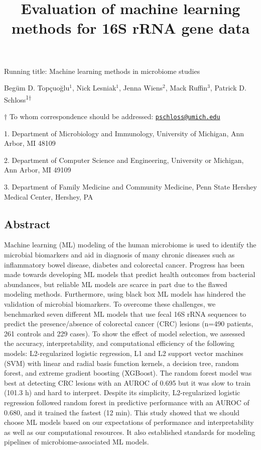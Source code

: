 \documentclass[11pt,]{article}
\title{\textbf{Evaluation of machine learning methods for 16S rRNA gene data}}
\author{}
\date{}
\begin{document}
\maketitle

\vspace{35mm}

Running title: Machine learning methods in microbiome studies

\vspace{35mm}

Begüm D. Topçuoğlu\({^1}\), Nick Lesniak\({^1}\), Jenna Wiens\({^2}\),
Mack Ruffin\({^3}\), Patrick D. Schloss\textsuperscript{1\(\dagger\)}

\vspace{40mm}

\(\dagger\) To whom correspondence should be addressed:
\href{mailto:pschloss@umich.edu}{\nolinkurl{pschloss@umich.edu}}

1. Department of Microbiology and Immunology, University of Michigan,
Ann Arbor, MI 48109

2. Department of Computer Science and Engineering, University or
Michigan, Ann Arbor, MI 49109

3. Department of Family Medicine and Community Medicine, Penn State
Hershey Medical Center, Hershey, PA

\newpage

\linenumbers

\subsection{Abstract}\label{abstract}

Machine learning (ML) modeling of the human microbiome is used to
identify the microbial biomarkers and aid in diagnosis of many chronic
diseases such as inflammatory bowel disease, diabetes and colorectal
cancer. Progress has been made towards developing ML models that predict
health outcomes from bacterial abundances, but reliable ML models are
scarce in part due to the flawed modeling methods. Furthermore, using
black box ML models has hindered the validation of microbial biomarkers.
To overcome these challenges, we benchmarked seven different ML models
that use fecal 16S rRNA sequences to predict the presence/absence of
colorectal cancer (CRC) lesions (n=490 patients, 261 controls and 229
cases). To show the effect of model selection, we assessed the accuracy,
interpretability, and computational efficiency of the following models:
L2-regularized logistic regression, L1 and L2 support vector machines
(SVM) with linear and radial basis function kernels, a decision tree,
random forest, and extreme gradient boosting (XGBoost). The random
forest model was best at detecting CRC lesions with an AUROC of 0.695
but it was slow to train (101.3 h) and hard to interpret. Despite its
simplicity, L2-regularized logistic regression followed random forest in
predictive performance with an AUROC of 0.680, and it trained the
fastest (12 min). This study showed that we should choose ML models
based on our expectations of performance and interpretability as well as
our computational resources. It also established standards for modeling
pipelines of microbiome-associated ML models.
\end{document}
